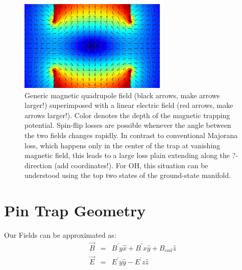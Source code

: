 \documentclass[%
 reprint,
 amsmath,amssymb,
 aps,
prl,
]{revtex4-1}
\begin{document}
                                                                                                                                                                                                                                                                                                                                                                                                                                                                                                                                                                                                                                                                                                                              

\begin{figure}[b]
\includegraphics[width=70mm]{rainbow_EB_angle_ring.png}%
\caption{
Generic magnetic quadrupole field (black arrows, make arrows larger!) superimposed with a linear electric field (red arrows, make arrows larger!). Color denotes the depth of the magnetic trapping potential. Spin-flip losses are possible whenever the angle between the two fields changes rapidly. In contrast to conventional Majorana loss, which happens only in the center of the trap at vanishing magnetic field, this leads to a large loss plain extending along the ?-direction (add coordinates!). For OH, this situation can be understood using the top two states of the ground-state manifold. 
\label{fig:EBangle}}
\end{figure}



\section{Pin Trap Geometry \label{sec:ptg} }
Our Fields can be approximated as:
\begin{eqnarray}
\vec{B} &=&  B^\prime y\hat{x}+ B^\prime x\hat{y} + B_{coil} \hat{z}\\
\vec{E} &=&  E^\prime y\hat{y}-  E^\prime z\hat{z}
\end{eqnarray}
\end{document}
